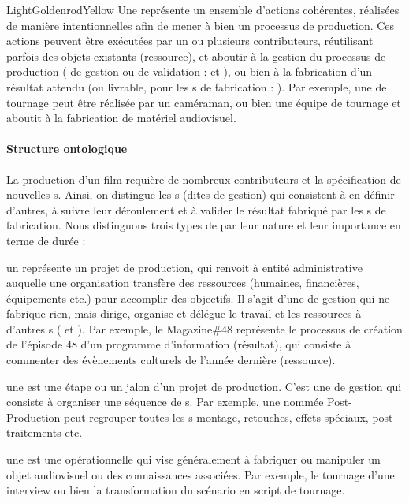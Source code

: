 \begin{cadrecol}{LightGoldenrodYellow}
Une  représente un ensemble d'actions cohérentes, réalisées de manière intentionnelles afin de mener à bien un processus de production. 
Ces actions peuvent être exécutées par un ou plusieurs contributeurs, réutilisant parfois des objets existants (ressource), et aboutir à la gestion du processus de production ( de gestion ou de validation :  et ), ou bien à la fabrication d'un résultat attendu (ou livrable, pour les s de fabrication : ). 
Par exemple, une  de tournage peut être réalisée par un caméraman, ou bien une équipe de tournage et aboutit à la fabrication de matériel audiovisuel.
\end{cadrecol}

 

\paragraph{Structure ontologique} 
La production d'un film requière de nombreux contributeurs et la spécification de nouvelles s.
Ainsi, on distingue les s (dites de gestion) qui consistent à en définir d'autres, à suivre leur déroulement et à valider le résultat fabriqué par les s de fabrication. 
Nous distinguons trois types de  par leur nature et leur importance en terme de durée : 
\begin{liste}
	\item un  représente un projet de production, qui renvoit à entité administrative auquelle une organisation transfère des ressources (humaines, financières, équipements etc.) pour accomplir des objectifs. 
	Il s'agit d'une  de gestion qui ne fabrique rien, mais dirige, organise et délégue le travail et les ressources à d'autres s ( et ).
	Par exemple, le  Magazine\#48 représente le processus de création de l'épisode 48 d'un programme d'information (résultat), qui consiste à commenter des évènements culturels de l'année dernière (ressource).

	\item une  est une étape ou un jalon d'un projet de production. 
	C'est une  de gestion qui consiste à organiser une séquence de s.
	Par exemple, une  nommée Post-Production peut regrouper toutes les s montage, retouches, effets spéciaux, post-traitements etc.

	\item une  est une  opérationnelle qui vise généralement à fabriquer ou manipuler un objet audiovisuel ou des connaissances associées.
	Par exemple, le tournage d'une interview ou bien la transformation du scénario en script de tournage. 
\end{liste}

